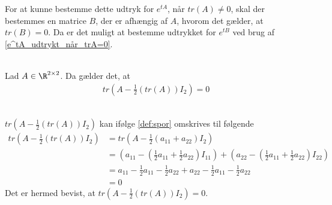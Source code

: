 For at kunne bestemme dette udtryk for $e^{tA}$, når $tr(A) \neq 0$, skal der bestemmes en matrice $B$, der er afhængig af $A$, hvorom det gælder, at $tr(B)=0$. Da er det muligt at bestemme udtrykket for $e^{tB}$ ved brug af \autoref{e^tA_udtrykt_når_trA=0}.

\begin{thmx}\textbf{}\label{sæt:tr(a-led)=0}\\
Lad $A\in \R^{2\times2}$. Da gælder det, at 
\begin{align*}
    tr\left(A-\frac{1}{2}\left(tr\left(A\right)\right)I_2\right) = 0
\end{align*}
\end{thmx}

\begin{bev}\textbf{}\\
$tr\left(A-\frac{1}{2}\left(tr\left(A\right)\right)I_2\right)$ kan ifølge \autoref{def:spor} omskrives til følgende
\begin{align*}
    tr\left(A-\frac{1}{2}\left(tr\left(A\right)\right)I_2\right) &= tr\left(A-\frac{1}{2}\left(a_{11}+a_{22}\right)I_2\right) \\
    &= \left(a_{11}-\left(\frac{1}{2}a_{11} + \frac{1}{2}a_{22}\right)I_{11}\right)+ \left(a_{22}-\left(\frac{1}{2}a_{11} + \frac{1}{2}a_{22}\right)I_{22}\right)\\
    &=a_{11}-\frac{1}{2}a_{11}-\frac{1}{2}a_{22}+a_{22}-\frac{1}{2}a_{11}-\frac{1}{2}a_{22}\\
    &=0
\end{align*}
Det er hermed bevist, at $tr\left(A-\frac{1}{2}\left(tr\left(A\right)\right)I_2\right) = 0$.
\end{bev}


